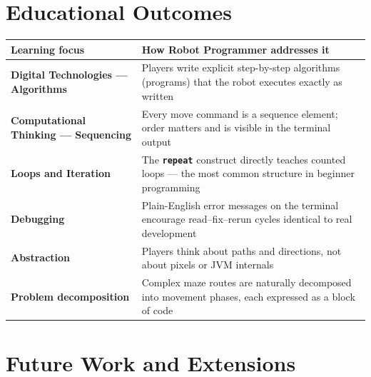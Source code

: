 \documentclass[12pt,a4paper]{article}
\newcommand{\keyword}[1]{\textcolor{keyword}{\texttt{\bfseries #1}}}
\begin{document}
\section{Educational Outcomes}

\begin{tcolorbox}[gddbox, title={Learning Outcomes Mapped to Core Curriculum}]
\begin{tabularx}{\linewidth}{>{\bfseries\sffamily\color{primary}}p{4cm} X}
  \toprule
  Learning focus & How Robot Programmer addresses it \\
  \midrule
  \textbf{Digital Technologies — Algorithms} & Players write explicit step-by-step algorithms (programs) that the robot executes exactly as written \\
  \textbf{Computational Thinking — Sequencing} & Every move command is a sequence element; order matters and is visible in the terminal output \\
  \textbf{Loops and Iteration} & The \keyword{repeat} construct directly teaches counted loops — the most common structure in beginner programming \\
  \textbf{Debugging} & Plain-English error messages on the terminal encourage read–fix–rerun cycles identical to real development \\
  \textbf{Abstraction} & Players think about paths and directions, not about pixels or JVM internals \\
  \textbf{Problem decomposition} & Complex maze routes are naturally decomposed into movement phases, each expressed as a block of code \\
  \bottomrule
\end{tabularx}
\end{tcolorbox}

\section{Future Work and Extensions}
\end{document}
